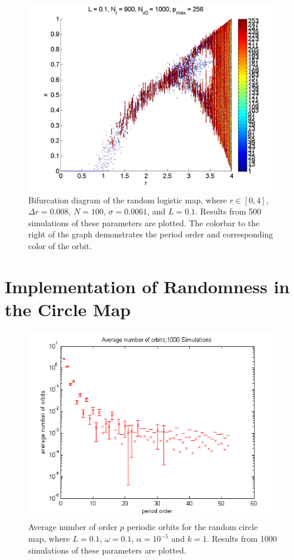 \begin{figure}[!h]
\caption[Bifurcation diagram of the random logistic map]{Bifurcation diagram of the random
logistic map, where $r \in [0,4]$, $\Delta r = 0.008$, $N=100$, $\sigma
= 0.0061$, and $L=0.1$. Results from 500
simulations of these parameters are plotted. The colorbar to the right
of the graph demonstrates the period order and corresponding color of
the orbit.}
	\begin{center}
		\includegraphics[scale=0.7]{figs/rlog_bif_L_01_3.png}
	\end{center}
\end{figure}

\section{Implementation of Randomness in the Circle Map}
\begin{figure}[!h]
\caption[Average number of order $p$ orbits for the random circle
map]{Average number of order $p$ periodic orbits for the random circle
map, where $L=0.1$, $\omega =0.1$, $\alpha = 10^{-5}$ and $k=1$. Results from 1000
simulations of these parameters are plotted.}
	\begin{center}
		\includegraphics[scale=0.7]{figs/rcirc_avg_num_1000_sim_logscale.png}
	\end{center}
\end{figure}

